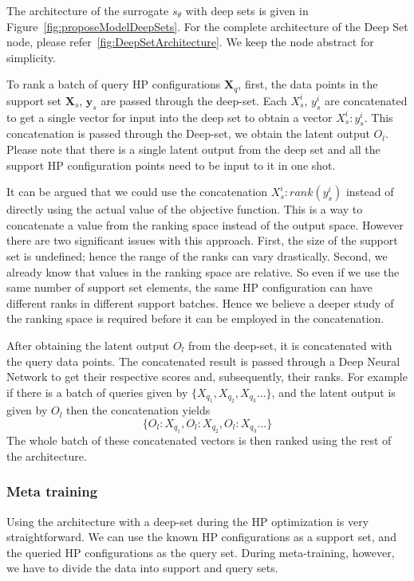 \documentclass[12pt, twoside, ngerman]{report}
\begin{document}
The  architecture of the surrogate $s_{\theta}$ with deep sets is given in Figure~\ref{fig:proposeModelDeepSets}.
For the complete architecture of the Deep Set node, please refer~\ref{fig:DeepSetArchitecture}.
We keep the node abstract for simplicity.

To rank a batch of query HP configurations $\textbf{X}_q$, first, the data points in the support set $\textbf{X}_s$, $\textbf{y}_s$ are passed through the deep-set.
Each $X_s^i$, $y_s^i$ are concatenated to get a single vector for input into the deep set to obtain a vector $X_s^i : y_s^i$.
This concatenation is passed through the Deep-set, we obtain the latent output $O_l$.
Please note that there is a single latent output from the deep set and all the support HP configuration points need to be input to it in one shot.

It can be argued that we could use the concatenation $X_s^i : rank(y_s^i)$ instead of directly using the actual value of the objective function. This is a way to concatenate a value from the ranking space instead of the output space. However there are two significant issues with this approach. First, the size of the support set is undefined; hence the range of the ranks can vary drastically. Second, we already know that values in the ranking space are relative. So even if we use the same number of support set elements, the same HP configuration can have different ranks in different support batches. Hence we believe a deeper study of the ranking space is required before it can be employed in the concatenation.

After obtaining the latent output $O_l$ from the deep-set,  it is concatenated with the query data points.
The concatenated result is passed through a Deep Neural Network to get their respective scores and, subsequently, their ranks.
For example if there is a batch of queries given by $\{X_{q_1},  X_{q_2},  X_{q_3} ...\}$,  and the latent output is given by $O_l$ then the concatenation yields
$$
\{O_l:X_{q_1},  O_l:X_{q_2},  O_l:X_{q_3} ...\}
$$
The whole batch of these concatenated vectors is then ranked using the rest of the architecture.

\subsubsection{Meta training}

Using the architecture with a deep-set during the HP optimization is very straightforward.
We can use the known HP configurations as a support set, and the queried HP configurations as the query set.
During meta-training,  however,  we have to divide the data into support and query sets.
\end{document}
